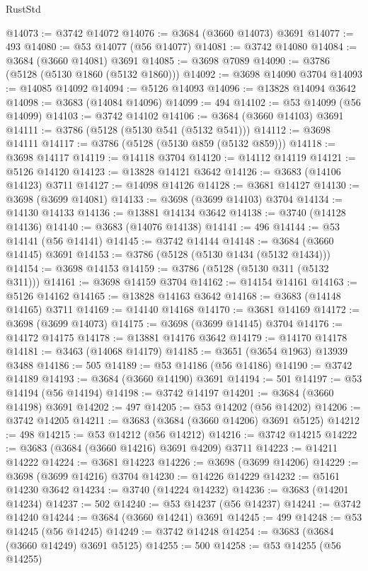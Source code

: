 \begin{lexlean}{RustStd}
\begin{coremodule}
@14073 := @3742 @14072
@14076 := @3684 (@3660 @14073) @3691
@14077 := 493
@14080 := @53 @14077 (@56 @14077)
@14081 := @3742 @14080
@14084 := @3684 (@3660 @14081) @3691
@14085 := @3698 @7089
@14090 := @3786 (@5128 (@5130 @1860 (@5132 @1860)))
@14092 := @3698 @14090 @3704
@14093 := @14085 @14092
@14094 := @5126 @14093
@14096 := @13828 @14094 @3642
@14098 := @3683 (@14084 @14096)
@14099 := 494
@14102 := @53 @14099 (@56 @14099)
@14103 := @3742 @14102
@14106 := @3684 (@3660 @14103) @3691
@14111 := @3786 (@5128 (@5130 @541 (@5132 @541)))
@14112 := @3698 @14111
@14117 := @3786 (@5128 (@5130 @859 (@5132 @859)))
@14118 := @3698 @14117
@14119 := @14118 @3704
@14120 := @14112 @14119
@14121 := @5126 @14120
@14123 := @13828 @14121 @3642
@14126 := @3683 (@14106 @14123) @3711
@14127 := @14098 @14126
@14128 := @3681 @14127
@14130 := @3698 (@3699 @14081)
@14133 := @3698 (@3699 @14103) @3704
@14134 := @14130 @14133
@14136 := @13881 @14134 @3642
@14138 := @3740 (@14128 @14136)
@14140 := @3683 (@14076 @14138)
@14141 := 496
@14144 := @53 @14141 (@56 @14141)
@14145 := @3742 @14144
@14148 := @3684 (@3660 @14145) @3691
@14153 := @3786 (@5128 (@5130 @1434 (@5132 @1434)))
@14154 := @3698 @14153
@14159 := @3786 (@5128 (@5130 @311 (@5132 @311)))
@14161 := @3698 @14159 @3704
@14162 := @14154 @14161
@14163 := @5126 @14162
@14165 := @13828 @14163 @3642
@14168 := @3683 (@14148 @14165) @3711
@14169 := @14140 @14168
@14170 := @3681 @14169
@14172 := @3698 (@3699 @14073)
@14175 := @3698 (@3699 @14145) @3704
@14176 := @14172 @14175
@14178 := @13881 @14176 @3642
@14179 := @14170 @14178
@14181 := @3463 (@14068 @14179)
@14185 := @3651 (@3654 @1963) @13939 @3488
@14186 := 505
@14189 := @53 @14186 (@56 @14186)
@14190 := @3742 @14189
@14193 := @3684 (@3660 @14190) @3691
@14194 := 501
@14197 := @53 @14194 (@56 @14194)
@14198 := @3742 @14197
@14201 := @3684 (@3660 @14198) @3691
@14202 := 497
@14205 := @53 @14202 (@56 @14202)
@14206 := @3742 @14205
@14211 := @3683 (@3684 (@3660 @14206) @3691 @5125)
@14212 := 498
@14215 := @53 @14212 (@56 @14212)
@14216 := @3742 @14215
@14222 := @3683 (@3684 (@3660 @14216) @3691 @4209) @3711
@14223 := @14211 @14222
@14224 := @3681 @14223
@14226 := @3698 (@3699 @14206)
@14229 := @3698 (@3699 @14216) @3704
@14230 := @14226 @14229
@14232 := @5161 @14230 @3642
@14234 := @3740 (@14224 @14232)
@14236 := @3683 (@14201 @14234)
@14237 := 502
@14240 := @53 @14237 (@56 @14237)
@14241 := @3742 @14240
@14244 := @3684 (@3660 @14241) @3691
@14245 := 499
@14248 := @53 @14245 (@56 @14245)
@14249 := @3742 @14248
@14254 := @3683 (@3684 (@3660 @14249) @3691 @5125)
@14255 := 500
@14258 := @53 @14255 (@56 @14255)

\end{coremodule}
\end{lexlean}
